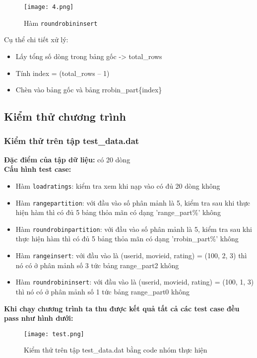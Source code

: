 \documentclass[a4paper]{article}
\begin{document}
\begin{figure}[H]
    \centering
    \texttt{[image: 4.png]}
    \caption{Hàm \texttt{roundrobininsert}}

\end{figure}

Cụ thể chi tiết xử lý:
\begin{itemize}
    \item Lấy tổng số dòng trong bảng gốc -> total\_rows
    \item Tính index = (total\_rows – 1) %
    \item Chèn vào bảng gốc và bảng rrobin\_part\{index\}
\end{itemize}

\subsection{Kiểm thử chương trình}
\subsubsection{Kiểm thử trên tập test\_data.dat}
\textbf{Đặc điểm của tập dữ liệu:} có 20 dòng\\
\textbf{Cấu hình test case:}
\begin{itemize}
    \item Hàm \texttt{loadratings}: kiểm tra xem khi nạp vào có đủ 20 dòng không
    \item Hàm \texttt{rangepartition}: với đầu vào số phân mảnh là 5, kiểm tra sau khi thực hiện hàm thì có đủ 5 bảng thỏa mãn có dạng 'range\_part\%' không
    \item Hàm \texttt{roundrobinpartition}: với đầu vào số phân mảnh là 5, kiểm tra sau khi thực hiện hàm thì có đủ 5 bảng thỏa mãn có dạng 'rrobin\_part\%' không
    \item Hàm \texttt{rangeinsert}: với đầu vào là (userid, movieid, rating) = (100, 2, 3) thì nó có ở phân mảnh số 3 tức bảng range\_part2 không
    \item Hàm \texttt{roundrobininsert}: với đầu vào là (userid, movieid, rating) = (100, 1, 3) thì nó có ở phân mảnh số 1 tức bảng range\_part0 không
\end{itemize}
\textbf{Khi chạy chương trình ta thu được kết quả tất cả các test case đều pass như hình dưới:}
\begin{figure}[H]
    \centering
    \texttt{[image: test.png]}
    \caption{Kiểm thử trên tập test\_data.dat bằng code nhóm thực hiện}

\end{figure}
\end{document}
